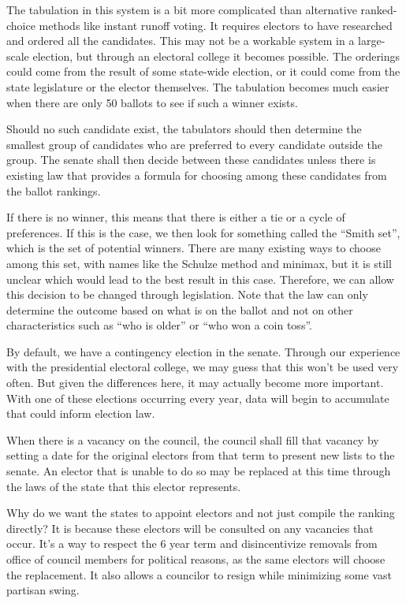 \documentclass{article}
\begin{document}
The tabulation in this system is a bit more complicated than alternative ranked-choice methods like instant runoff voting. It requires electors to have researched and ordered all the candidates. This may not be a workable system in a large-scale election, but through an electoral college it becomes possible. The orderings could come from the result of some state-wide election, or it could come from the state legislature or the elector themselves. The tabulation becomes much easier when there are only 50 ballots to see if such a winner exists.

\begin{quoting}
Should no such candidate exist, the tabulators should then determine the smallest group of candidates who are preferred to every candidate outside the group. The senate shall then decide between these candidates unless there is existing law that provides a formula for choosing among these candidates from the ballot rankings.
\end{quoting}

If there is no winner, this means that there is either a tie or a cycle of preferences. If this is the case, we then look for something called the “Smith set”, which is the set of potential winners. There are many existing ways to choose among this set, with names like the Schulze method\cite{Schulze} and minimax, but it is still unclear which would lead to the best result in this case. Therefore, we can allow this decision to be changed through legislation. Note that the law can only determine the outcome based on what is on the ballot and not on other characteristics such as “who is older” or “who won a coin toss”.

By default, we have a contingency election in the senate. Through our experience with the presidential electoral college, we may guess that this won’t be used very often. But given the differences here, it may actually become more important. With one of these elections occurring every year, data will begin to accumulate that could inform election law.

\begin{quoting}
When there is a vacancy on the council, the council shall fill that vacancy by setting a date for the original electors from that term to present new lists to the senate. An elector that is unable to do so may be replaced at this time through the laws of the state that this elector represents.
\end{quoting}

Why do we want the states to appoint electors and not just compile the ranking directly? It is because these electors will be consulted on any vacancies that occur. It’s a way to respect the 6 year term and disincentivize removals from office of council members for political reasons, as the same electors will choose the replacement. It also allows a councilor to resign while minimizing some vast partisan swing.
\end{document}
